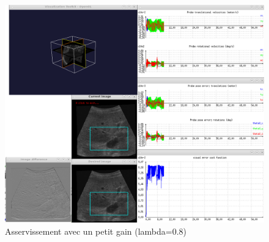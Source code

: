 \documentclass[a4paper,11pt]{article}
\begin{document}
\begin{figure}[H]
    \centering
    \includegraphics[width=0.5\textheight]{./images/q10_big.png}
    \caption{Asservissement avec un petit gain (lambda=0.8)}
    \label{bigGain}
\end{figure}
\end{document}
